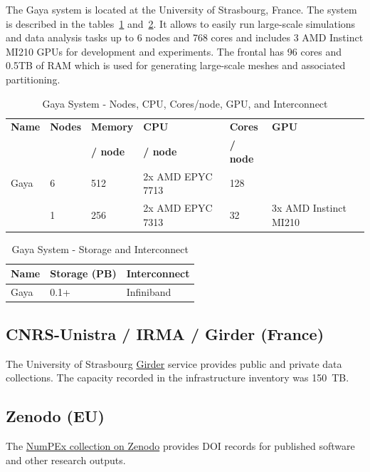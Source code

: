 The Gaya system is located at the University of Strasbourg, France. The system is described in the tables~\ref{tab:gaya_flops_cpu_gpu} and~\ref{tab:gaya_storage_interconnect}. It allows to easily run large-scale simulations and data analysis tasks up to 6 nodes and 768 cores and includes 3 AMD Instinct MI210 GPUs for development and experiments.
The frontal has 96 cores and 0.5TB of RAM which is used for generating large-scale meshes and associated partitioning.

\begin{table}[!ht]
    \centering
    \begin{tabular}{l l l l l l}
    \toprule
    \textbf{Name} & \textbf{Nodes} & \textbf{Memory} & \textbf{CPU} & \textbf{Cores} & \textbf{GPU} \\
    &  & \textbf{/ node} & \textbf{/ node}  & \textbf{/ node} &  \\
    \midrule
    Gaya &  6  & 512 & 2x AMD EPYC 7713 & 128 &  \\
         &  1 & 256 & 2x AMD EPYC 7313 & 32 & 3x AMD Instinct MI210 \\
    \bottomrule
    \end{tabular}
    \caption{Gaya System - Nodes, CPU, Cores/node, GPU, and Interconnect}
    \label{tab:gaya_flops_cpu_gpu}
\end{table}

    \begin{table}[!ht]
        \centering
        \begin{tabular}{l l l}
        \toprule
        \textbf{Name} & \textbf{Storage (PB)} & \textbf{Interconnect} \\
        \midrule
        Gaya & 0.1+ & Infiniband \\
        \bottomrule
    \end{tabular}
    \caption{Gaya System - Storage and Interconnect}
    \label{tab:gaya_storage_interconnect}
    \end{table}

\subsection*{CNRS-Unistra / IRMA / Girder (France)}
\label{sec:arch:girder:unistra}

The University of Strasbourg \href{https://girder.math.unistra.fr}{Girder}
service provides public and private data collections. The capacity recorded
in the infrastructure inventory was 150~TB.

\subsection*{Zenodo (EU)}
\label{sec:arch:zenodo}

The \href{https://zenodo.org/communities/numpex}{NumPEx collection on
Zenodo} provides DOI records for published software and other research outputs.
